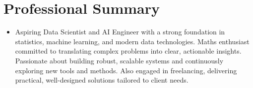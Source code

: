 \section{Professional Summary}
\vspace{2pt}
\begin{itemize}[leftmargin=0.0in, label={}]
    \item{
        \normalsize{
            Aspiring Data Scientist and AI Engineer with a strong foundation in statistics, machine learning, and modern data technologies. Maths enthusiast committed to translating complex problems into clear, actionable insights. Passionate about building robust, scalable systems and continuously exploring new tools and methods. Also engaged in freelancing, delivering practical, well-designed solutions tailored to client needs.
        }
    }
\end{itemize}